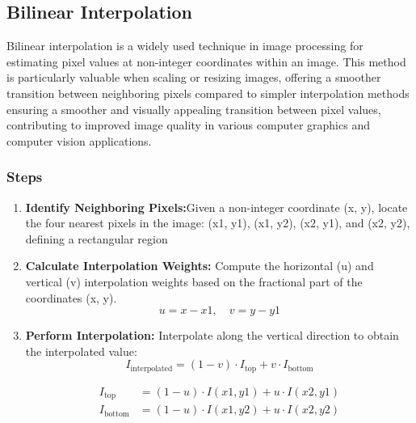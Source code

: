 \subsection{Bilinear Interpolation }
Bilinear interpolation is a widely used technique in image processing for estimating pixel values at non-integer coordinates within an image. This method is particularly valuable when scaling or resizing images, offering a smoother transition between neighboring pixels compared to simpler interpolation methods ensuring a smoother and visually appealing transition between pixel values, contributing to improved image quality in various computer graphics and computer vision applications.   
\subsubsection{Steps}
\begin{enumerate}
    \item \textbf{Identify Neighboring Pixels:}Given a non-integer coordinate (x, y), locate the four nearest pixels in the image: (x1, y1), (x1, y2), (x2, y1), and (x2, y2), defining a rectangular region 

    \item \textbf{Calculate Interpolation Weights:} Compute the horizontal (u) and vertical (v) interpolation weights based on the fractional part of the coordinates (x, y).
        \[
    u = x - x1, \quad v = y - y1
    \]

    \item \textbf{Perform Interpolation:} Interpolate along the vertical direction to obtain the interpolated value:
    \[
    I_{\text{interpolated}} = (1 - v) \cdot I_{\text{top}} + v \cdot I_{\text{bottom}}
    \]

    \begin{align*}
    I_{\text{top}} & = (1 - u) \cdot I(x1, y1) + u \cdot I(x2, y1) \\
    I_{\text{bottom}} & = (1 - u) \cdot I(x1, y2) + u \cdot I(x2, y2)
    \end{align*}

    \end{enumerate}